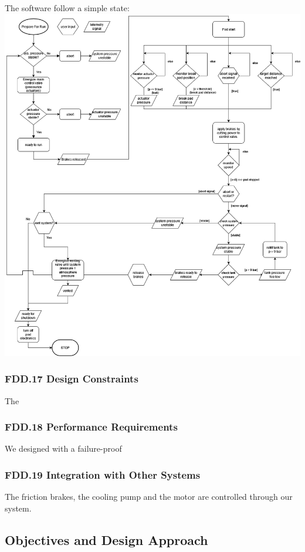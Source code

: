 The software follow a simple state: \\
\includegraphics[width=\textwidth]{texfiles/elec/eimg/brakesoftware_ext}
 
\subsubsection{FDD.17 Design Constraints}
The
 
\subsubsection{FDD.18 Performance Requirements}
We designed with a failure-proof 
 
\subsubsection{FDD.19 Integration with Other Systems}
The friction brakes, the cooling pump and the motor are controlled through our system.
 
\subsection{Objectives and Design Approach}
